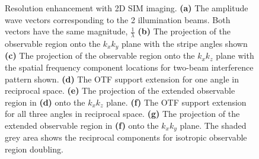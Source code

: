 \begin{figure}[h]
\begin{subfigure}[t]{0.5\textwidth}
		\caption{}
		\label{fig:3D_SIM_OTF_xy_expansion_w_double_rad_filled}
	\end{subfigure}
	\caption[Resolution enhancement with 2D SIM imaging]{Resolution enhancement 
		with 2D SIM imaging. \textbf{(a)} The amplitude wave vectors 
		corresponding to the 2 illumination beams. Both vectors have the 
		same magnitude, $\frac{1}{\lambda}$ \textbf{(b)} The projection of the 
		observable region onto the $k_{x}k_{y}$ plane with the stripe angles 
		shown \textbf{(c)} The projection of the observable region onto the 
		$k_{x}k_{z}$ plane with the spatial frequency component locations for
		two-beam interference pattern shown. \textbf{(d)} The OTF support
		extension for one angle in reciprocal space. \textbf{(e)} The projection 
		of the extended observable region in \textbf{(d)} onto the $k_{x}k_{z}$ 
		plane. \textbf{(f)} The OTF support	extension for all three angles in 
		reciprocal space. \textbf{(g)} The projection of the extended observable 
		region in \textbf{(f)} onto the $k_{x}k_{y}$ plane. The shaded grey area
		shows the reciprocal components for isotropic observable region doubling.}
	\label{fig:2D_SIM_visualisation}
\end{figure}

